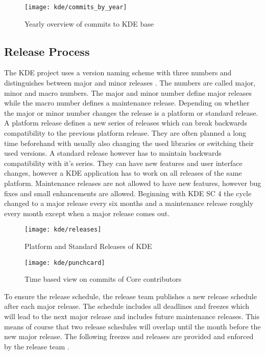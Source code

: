 \begin{figure}[htbp]
  \centering
  \texttt{[image: kde/commits\_by\_year]}
  \caption{Yearly overview of commits to KDE base}
\end{figure}


\subsection{Release Process} %
\label{sub:Release Process}

The KDE project uses a version naming scheme with three numbers and
distinguishes between major and minor releases
\cite{KDEReleaseTeam,KDEReleaseSchedule,KDESchedule}. The numbers are called
major, minor and macro numbers. The major and minor number define major
releases while the macro number defines a maintenance release. Depending on
whether the major or minor number changes the release is a platform or standard
release. A platform release defines a new series of releases which can break
backwards compatibility to the previous platform release. They are often
planned a long time beforehand with usually also changing the used libraries or
switching their used versions. A standard release however has to maintain
backwards compatibility with it's series. They can have new features and user
interface changes, however a KDE application has to work on all releases of the
same platform. Maintenance releases are not allowed to have new features,
however bug fixes and small enhancements are allowed. Beginning with \ac{KDE
SC} 4 the cycle changed to a major release every six months and a maintenance
release roughly every month except when a major release comes out.

\begin{figure}[htbp]
  \centering
  \texttt{[image: kde/releases]}
  \caption{Platform and Standard Releases of KDE}
\end{figure}

\begin{figure}[htbp]
  \centering
  \texttt{[image: kde/punchcard]}
  \caption{Time based view on commits of Core contributors}
\end{figure}

To ensure the release schedule, the release team publishes a new release
schedule after each major release. The schedule includes all deadlines and
freezes which will lead to the next major release and includes future
maintenance releases. This means of course that two release schedules will
overlap until the month before the new major release. The following freezes and
releases are provided and enforced by the release team
\cite{KDEReleaseSchedule}.

